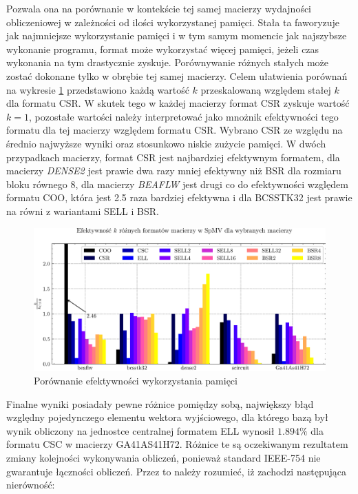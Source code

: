 Pozwala ona na porównanie w kontekście tej samej macierzy wydajności obliczeniowej w zależności od ilości wykorzystanej pamięci.
Stała ta faworyzuje jak najmniejsze wykorzystanie pamięci i w tym samym momencie jak najszybsze wykonanie programu, format może wykorzystać więcej pamięci, jeżeli czas wykonania na tym drastycznie zyskuje.
Porównywanie różnych stałych może zostać dokonane tylko w obrębie tej samej macierzy.
Celem ułatwienia porównań na wykresie \ref{all_k_plot} przedstawiono każdą wartość $k$ przeskalowaną względem stałej $k$ dla formatu CSR.
W skutek tego w każdej macierzy format CSR zyskuje wartość $k = 1$, pozostałe wartości należy interpretować jako mnożnik efektywności tego formatu dla tej macierzy względem formatu CSR.
Wybrano CSR ze względu na średnio najwyższe wyniki oraz stosunkowo niskie zużycie pamięci.
W dwóch przypadkach macierzy, format CSR jest najbardziej efektywnym formatem, dla macierzy \textit{DENSE2} jest prawie dwa razy mniej efektywny niż BSR dla rozmiaru bloku równego $8$, dla macierzy \textit{BEAFLW} jest drugi co do efektywności względem formatu COO, która jest 2.5 raza bardziej efektywna i dla BCSSTK32 jest prawie na równi z wariantami SELL i BSR.

\begin{figure}[!htb]
    \centering
    \includegraphics[width=\linewidth]{result_plots/barchart_memory.png}
    \caption{Porównanie efektywności wykorzystania pamięci}\label{all_k_plot}
\end{figure}

Finalne wyniki posiadały pewne różnice pomiędzy sobą, największy błąd względny pojedynczego elementu wektora wyjściowego, dla którego bazą był wynik obliczony na jednostce centralnej formatem ELL wynosił $1.894\%$ dla formatu CSC w macierzy GA41AS41H72.
Różnice te są oczekiwanym rezultatem zmiany kolejności wykonywania obliczeń, ponieważ standard IEEE-754  \cite{FloatPoint} nie gwarantuje łączności obliczeń.
Przez to należy rozumieć, iż zachodzi następująca nierówność:

